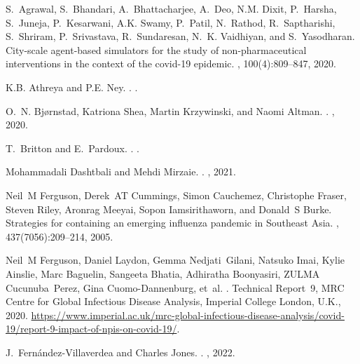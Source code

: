 \documentclass{article}
\theoremstyle{definition}
\begin{document}
\begin{thebibliography}{10}

S.~Agrawal, S.~Bhandari, A.~Bhattacharjee, A.~Deo, N.M. Dixit, P.~Harsha,
  S.~Juneja, P.~Kesarwani, A.K. Swamy, P.~Patil, N.~Rathod, R.~Saptharishi,
  S.~Shriram, P.~Srivastava, R.~Sundaresan, N.~K. Vaidhiyan, and S.~Yasodharan.
\newblock City-scale agent-based simulators for the study of non-pharmaceutical
  interventions in the context of the covid-19 epidemic.
, 100(4):809--847,
  2020.

K.B. Athreya and P.E. Ney.
.
.

O.~N. Bjørnstad, Katriona Shea, Martin Krzywinski, and Naomi Altman.
.
, 2020.

T.~Britton and E.~Pardoux.
.
.

Mohammadali Dashtbali and Mehdi Mirzaie.
.
, 2021.

Neil~M Ferguson, Derek~AT Cummings, Simon Cauchemez, Christophe Fraser, Steven
  Riley, Aronrag Meeyai, Sopon Iamsirithaworn, and Donald~S Burke.
\newblock Strategies for containing an emerging influenza pandemic in
  {Southeast Asia}.
, 437(7056):209--214, 2005.

Neil~M Ferguson, Daniel Laydon, Gemma Nedjati~Gilani, Natsuko Imai, Kylie
  Ainslie, Marc Baguelin, Sangeeta Bhatia, Adhiratha Boonyasiri, ZULMA
  Cucunuba~Perez, Gina Cuomo-Dannenburg, et~al.
.
\newblock Technical Report~9, MRC Centre for Global Infectious Disease
  Analysis, Imperial College London, U.K., 2020.
\newblock
  \url{https://www.imperial.ac.uk/mrc-global-infectious-disease-analysis/covid-19/report-9-impact-of-npis-on-covid-19/}.

J.~Fernández-Villaverdea and Charles Jones.
.
, 2022.


\end{thebibliography}
\end{document}
